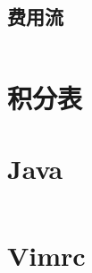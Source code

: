 \documentclass[titlepage,landscape,a4paper,10pt]{article}
\begin{document}
\begin{multicols}{2}
\begin{spacing}{0.8}
\section{费用流}
\inputminted{cpp}{improve/MincostFlow.cpp}

%





\end{spacing}
\end{multicols}
\section{积分表}



\begin{multicols}{2}
\begin{spacing}{0.8}


\section{Java}
\inputminted{java}{src/Main.java}

\section{Vimrc}
\inputminted{text}{src/vimrc.vim}
\end{spacing}

\end{multicols}
\end{document}
